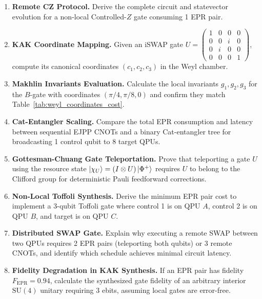 \begin{enumerate}[label=\textbf{6.\arabic*.}]
    \item \textbf{Remote CZ Protocol.} Derive the complete circuit and statevector evolution for a non-local Controlled-$Z$ gate consuming 1 EPR pair.
    \item \textbf{KAK Coordinate Mapping.} Given an iSWAP gate $U = \begin{pmatrix} 1 & 0 & 0 & 0 \\ 0 & 0 & i & 0 \\ 0 & i & 0 & 0 \\ 0 & 0 & 0 & 1 \end{pmatrix}$, compute its canonical coordinates $(c_1, c_2, c_3)$ in the Weyl chamber.
    \item \textbf{Makhlin Invariants Evaluation.} Calculate the local invariants $g_1, g_2, g_3$ for the $B$-gate with coordinates $(\pi/4, \pi/8, 0)$ and confirm they match Table~\ref{tab:weyl_coordinates_cost}.
    \item \textbf{Cat-Entangler Scaling.} Compare the total EPR consumption and latency between sequential EJPP CNOTs and a binary Cat-entangler tree for broadcasting 1 control qubit to 8 target QPUs.
    \item \textbf{Gottesman-Chuang Gate Teleportation.} Prove that teleporting a gate $U$ using the resource state $\ket{\chi_U} = (I \otimes U)\ket{\Phi^+}$ requires $U$ to belong to the Clifford group for deterministic Pauli feedforward corrections.
    \item \textbf{Non-Local Toffoli Synthesis.} Derive the minimum EPR pair cost to implement a 3-qubit Toffoli gate where control 1 is on QPU $A$, control 2 is on QPU $B$, and target is on QPU $C$.
    \item \textbf{Distributed SWAP Gate.} Explain why executing a remote SWAP between two QPUs requires 2 EPR pairs (teleporting both qubits) or 3 remote CNOTs, and identify which schedule achieves minimal circuit latency.
    \item \textbf{Fidelity Degradation in KAK Synthesis.} If an EPR pair has fidelity $F_{\text{EPR}} = 0.94$, calculate the synthesized gate fidelity of an arbitrary interior $\text{SU}(4)$ unitary requiring 3 ebits, assuming local gates are error-free.
\end{enumerate}
